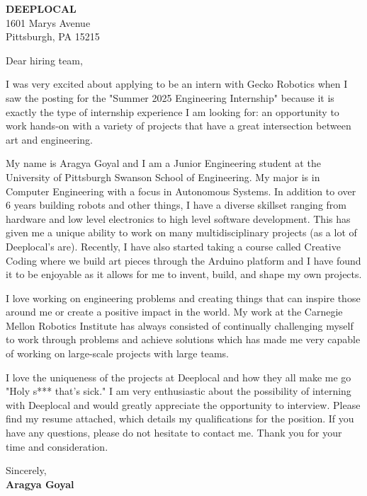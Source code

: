 \documentclass[a4paper,11pt]{letter}
\begin{document}

\noindent
\large \textbf{DEEPLOCAL} \\
\small 1601 Marys Avenue \\
\small Pittsburgh, PA 15215
\medskip

\normalsize Dear hiring team,

\noindent
I was very excited about applying to be an intern with Gecko Robotics when I saw the posting for the "Summer 2025 Engineering Internship" because it is exactly the type of internship experience I am looking for: an opportunity to work hands-on with a variety of projects that have a great intersection between art and engineering.

My name is Aragya Goyal and I am a Junior Engineering student at the University of Pittsburgh Swanson School of Engineering. My major is in Computer Engineering with a focus in Autonomous Systems. In addition to over 6 years building robots and other things, I have a diverse skillset ranging from hardware and low level electronics to high level software development. This has given me a unique ability to work on many multidisciplinary projects (as a lot of Deeplocal's are). Recently, I have also started taking a course called Creative Coding where we build art pieces through the Arduino platform and I have found it to be enjoyable as it allows for me to invent, build, and shape my own projects.

I love working on engineering problems and creating things that can inspire those around me or create a positive impact in the world. My work at the Carnegie Mellon Robotics Institute has always consisted of continually challenging myself to work through problems and achieve solutions which has made me very capable of working on large-scale projects with large teams.

I love the uniqueness of the projects at Deeplocal and how they all make me go "Holy s*** that's sick." I am very enthusiastic about the possibility of interning with Deeplocal and would greatly appreciate the opportunity to interview. Please find my resume attached, which details my qualifications for the position. If you have any questions, please do not hesitate to contact me. Thank you for your time and consideration.

\bigskip
\noindent
Sincerely,\\
\textbf{Aragya Goyal}
\end{document}
